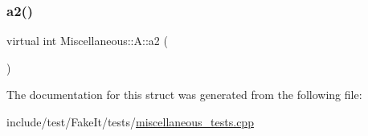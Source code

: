 \subsubsection{\texorpdfstring{a2()}{a2()}}
{\footnotesize\ttfamily virtual int Miscellaneous\+::\+A\+::a2 (\begin{DoxyParamCaption}{ }\end{DoxyParamCaption})\hspace{0.3cm}{\ttfamily [pure virtual]}}



The documentation for this struct was generated from the following file\+:\begin{DoxyCompactItemize}
\item 
include/test/\+Fake\+It/tests/\mbox{\hyperlink{miscellaneous__tests_8cpp}{miscellaneous\+\_\+tests.\+cpp}}\end{DoxyCompactItemize}
